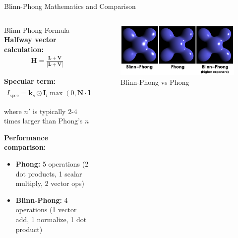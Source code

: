 \begin{frame}{Blinn-Phong Mathematics and Comparison}
  \begin{columns}
    \begin{column}{0.5\textwidth}
      \begin{mathbox}{Blinn-Phong Formula}
        \footnotesize
        \textbf{Halfway vector calculation:}
        \begin{align}
          \mathbf{H} = \frac{\mathbf{L} + \mathbf{V}}{|\mathbf{L} + \mathbf{V}|}
        \end{align}

        \textbf{Specular term:}
        \begin{align}
          I_{\text{spec}} = \mathbf{k}_s \odot \mathbf{I}_l \max(0, \mathbf{N} \cdot \mathbf{H})^{n'}
        \end{align}

        where $n'$ is typically 2-4 times larger than Phong's $n$

        \vspace{0.3cm}
        \pause
        \textbf{Performance comparison:}
        \begin{itemize}
          \item \textbf{Phong:} 5 operations (2 dot products, 1 scalar multiply, 2 vector ops)
          \item \textbf{Blinn-Phong:} 4 operations (1 vector add, 1 normalize, 1 dot product)
        \end{itemize}
      \end{mathbox}
    \end{column}
    \begin{column}{0.5\textwidth}
      \begin{figure}
        \centering
        \includegraphics[width=0.9\linewidth]{images/blinn-phong.png}
        \caption*{\scriptsize Blinn-Phong vs Phong}
      \end{figure}
    \end{column}
  \end{columns}
\end{frame}